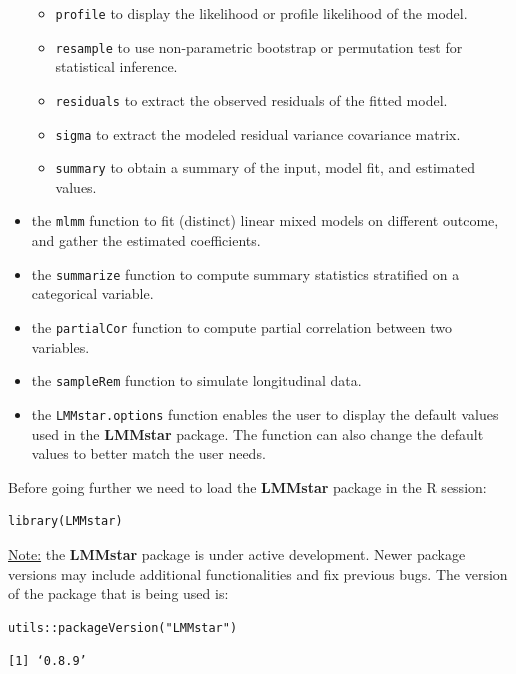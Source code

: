 \documentclass[12pt]{article}
\begin{document}
\begin{itemize}
\begin{itemize}
\item \texttt{profile} to display the likelihood or profile likelihood of the model.
\item \texttt{resample} to use non-parametric bootstrap or permutation test for statistical inference.
\item \texttt{residuals} to extract the observed residuals of the fitted model.
\item \texttt{sigma} to extract the modeled residual variance covariance matrix.
\item \texttt{summary} to obtain a summary of the input, model fit, and estimated values.
\end{itemize}
\item the \texttt{mlmm} function to fit (distinct) linear mixed models on
different outcome, and gather the estimated coefficients.
\item the \texttt{summarize} function to compute summary statistics stratified on a categorical variable.
\item the \texttt{partialCor} function to compute partial correlation between two variables.
\item the \texttt{sampleRem} function to simulate longitudinal data.
\item the \texttt{LMMstar.options} function enables the user to display the
default values used in the \textbf{LMMstar} package. The function
can also change the default values to better match the user needs.
\end{itemize}

\bigskip

Before going further we need to load the \textbf{LMMstar} package in the R
session:
\lstset{language=r,label= ,caption= ,captionpos=b,numbers=none}
\begin{lstlisting}
library(LMMstar)
\end{lstlisting}

\bigskip

\uline{Note:} the \textbf{LMMstar} package is under active development. Newer
package versions may include additional functionalities and fix
previous bugs. The version of the package that is being used is:
\lstset{language=r,label= ,caption= ,captionpos=b,numbers=none}
\begin{lstlisting}
utils::packageVersion("LMMstar")
\end{lstlisting}

\begin{verbatim}
[1] ‘0.8.9’
\end{verbatim}
\end{document}
